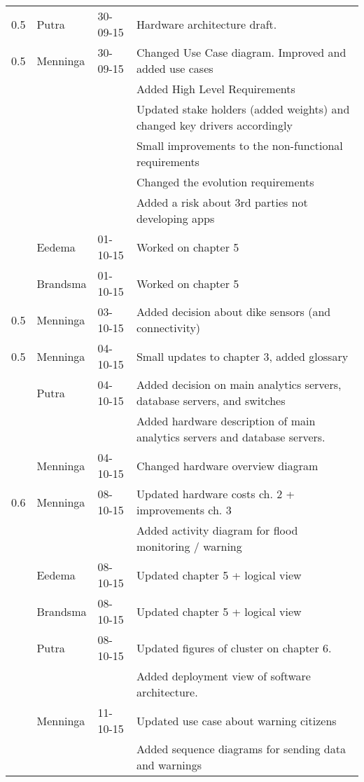 \begin{longtable}{L{} L{} L{} L{}}
    0.5 & Putra     & 30-09-15 & Hardware architecture draft.  \\
    0.5 & Menninga  & 30-09-15 & Changed Use Case diagram. Improved and added use cases \\
        &           &          & Added High Level Requirements \\
        &           &          & Updated stake holders (added weights) and changed key drivers accordingly \\
        &           &          & Small improvements to the non-functional requirements \\
        &           &          & Changed the evolution requirements \\
        &           &          & Added a risk about 3rd parties not developing apps \\
        & Eedema    & 01-10-15 & Worked on chapter 5 \\
        & Brandsma  & 01-10-15 & Worked on chapter 5 \\
    0.5 & Menninga  & 03-10-15 & Added decision about dike sensors (and connectivity) \\
    0.5 & Menninga  & 04-10-15 & Small updates to chapter 3, added glossary \\
        & Putra     & 04-10-15 & Added decision on main analytics servers, database servers, and switches \\
        &           &          & Added hardware description of main analytics servers and database servers. \\
        & Menninga  & 04-10-15 & Changed hardware overview diagram \\
	\midrule
    0.6 & Menninga  & 08-10-15 & Updated hardware costs ch. 2 + improvements ch. 3 \\
        &           &          & Added activity diagram for flood monitoring / warning \\
        & Eedema    & 08-10-15 & Updated chapter 5 + logical view \\
        & Brandsma  & 08-10-15 & Updated chapter 5 + logical view \\
        & Putra     & 08-10-15 & Updated figures of cluster on chapter 6.\\
        &           &          & Added deployment view of software architecture.\\
        & Menninga  & 11-10-15 & Updated use case about warning citizens \\
        &           &          & Added sequence diagrams for sending data and warnings \\

\end{longtable}
